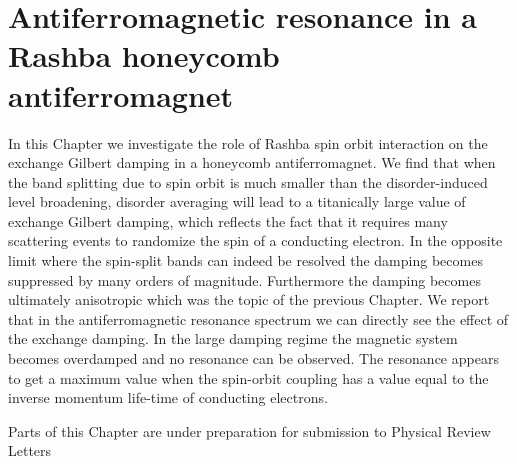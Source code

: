 \chapter{Antiferromagnetic resonance in a Rashba honeycomb antiferromagnet} %
In this Chapter we investigate the role of Rashba spin orbit interaction on the exchange Gilbert damping in a honeycomb antiferromagnet. We find that when the band splitting due to spin orbit is much smaller than the disorder-induced level broadening, disorder averaging will lead to a titanically large value of exchange Gilbert damping, which reflects the fact that it requires many scattering events to randomize the spin of a conducting electron. In the opposite limit where the spin-split bands can indeed be resolved the damping becomes suppressed by many orders of magnitude. Furthermore the damping becomes ultimately anisotropic which was the topic of the previous Chapter. We report that in the antiferromagnetic resonance spectrum we can directly see the effect of the exchange damping. In the large damping regime the magnetic system becomes overdamped and no resonance can be observed. The resonance appears to get a maximum value when the spin-orbit coupling has a value equal to the inverse momentum life-time of conducting electrons. 

\vfill
Parts of this Chapter are under preparation for submission to Physical Review Letters\clearpage




